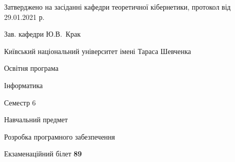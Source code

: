 \documentclass[10pt, ukrainian]{article}
\begin{document}
{\vspace{5mm}\smallskip \begin {small} Затверджено на засіданні кафедри теоретичної кібернетики, протокол  від   29.01.2021 р.\par\smallskip\smallskip
{\parbox {6.5 cm}{Зав. кафедри \dotfill Ю.В.~Крак}} \end{small}}
\newpage

{{\begin {small}\par
{ \center  Київський національний університет імені Тараса Шевченка \par}
{\parbox {5 cm}{Освітня програма \hfill}{\parbox {7 cm}{Інформатика \hfill}}\parbox {6 cm}{\hfill Семестр 6}}\par
{\parbox {5 cm} {Навчальний предмет \hfill}\parbox {7 cm}{Розробка програмного забезпечення \hfill}\parbox {6cm}{\hfill}\par}\vspace{-7pt} \end{small}}{\center Екзаменаційний білет \No \textbf
{ 89 }\par}}
\end{document}
